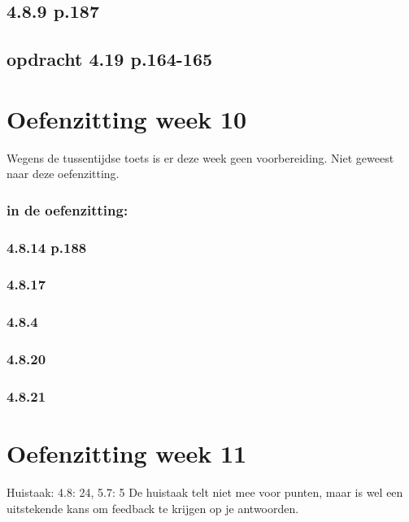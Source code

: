 \documentclass{article}
\begin{document}
\subsection*{4.8.9 p.187}

\subsection*{opdracht 4.19 p.164-165}

\section*{Oefenzitting week 10} 

Wegens de tussentijdse toets is er deze week geen voorbereiding.
Niet geweest naar deze oefenzitting. 

\subsubsection*{in de oefenzitting:} 

\subsubsection*{4.8.14 p.188} 


\subsubsection*{4.8.17} 

\subsubsection*{4.8.4} 

\subsubsection*{4.8.20} 

\subsubsection*{4.8.21} 





\section{Oefenzitting week 11}

Huistaak: 
4.8: 24, 5.7: 5 
De huistaak telt niet mee voor punten, maar is wel een uitstekende kans om feedback te krijgen op je antwoorden.
\end{document}
